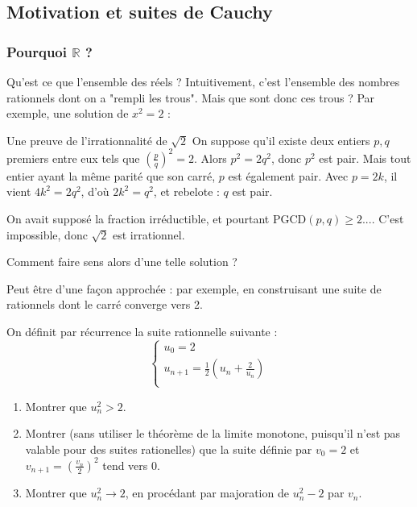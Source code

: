 \subsection{Motivation et suites de Cauchy}
\subsubsection{Pourquoi $\mathbb{R}$ ?}
Qu'est ce que l'ensemble des réels ? 
Intuitivement, c'est l'ensemble des nombres rationnels dont on a "rempli les trous". Mais que sont donc ces trous ? Par exemple, une solution de $x^2=2$ :

\begin{boite}{Une preuve de l'irrationnalité de $\sqrt{2}$}
    On suppose qu'il existe deux entiers $p,q$ premiers entre eux tels que $\left(\frac{p}{q}\right)^{2}=2$. Alors $p^2=2q^2$, donc $p^2$ est pair. Mais tout entier ayant la même parité que son carré, $p$ est également pair. Avec $p=2k$, il vient $4k^2=2q^2$, d'où $2k^2=q^2$, et rebelote : $q$ est pair.

    On avait supposé la fraction irréductible, et pourtant $\mathrm{PGCD}(p,q) \geq 2...$. C'est impossible, donc $\sqrt{2}$ est irrationnel.
\end{boite}

Comment faire sens alors d'une telle solution ?

Peut être d'une façon approchée : par exemple, en construisant une suite de rationnels dont le carré converge vers 2. 

\begin{exo}
    On définit par récurrence la suite rationnelle suivante :
$$\begin{cases}
u_0=2\\
u_{n+1}= \frac{1}{2}(u_n+\frac{2}{u_n})\\
\end{cases}$$
\begin{enumerate}[font=\color{blue!50!green}]
    \item Montrer que $u_n^2>2$.
    \item Montrer (sans utiliser le théorème de la limite monotone, puisqu'il n'est pas valable pour des suites rationelles) que la suite définie par $v_0=2$ et $v_{n+1}=(\frac{v_n}{2})^2$ tend vers 0.
    \item Montrer que $u_n^2 \to 2$, en procédant par majoration de $u_n^2-2$ par $v_n$.
\end{enumerate}
\end{exo}


